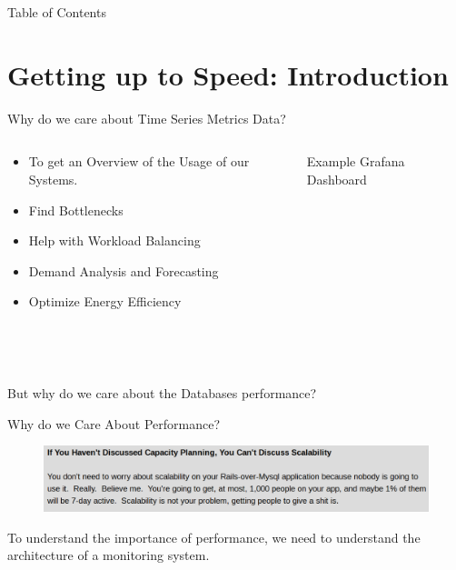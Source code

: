 \documentclass[compress,aspectratio=169]{beamer}
\begin{document}
\begin{frame}[plain]
	\titlepage
\end{frame}

\begin{frame}[t]{Table of Contents}
  \tableofcontents[subsectionstyle=hide/hide]
\end{frame}


\section[Introduction]{Getting up to Speed: Introduction}
\begin{frame}{Why do we care about Time Series Metrics Data?}
\begin{columns}[T]
\begin{column}{0.5\textwidth}
\begin{itemize}
  \item To get an Overview of the Usage of our Systems.
  \item Find Bottlenecks
  \item Help with Workload Balancing
  \item Demand Analysis and Forecasting
  \item Optimize Energy Efficiency
\end{itemize}
\end{column}
\begin{column}{0.5\textwidth}
\begin{figure}
  \caption{Example Grafana Dashboard}
\end{figure}
\end{column}
\end{columns}
~\\~\\
\pause
\begin{center}
  \large
But why do we care about the Databases performance?
\end{center}
\end{frame}

\begin{frame}{Why do we Care About Performance?}
\begin{center}
\begin{figure}
  \includegraphics[width=\textwidth]{assets/scalefoot.png}
  \caption{\cite{ScaleFoot}}
\end{figure}
To understand the importance of performance, we need to understand the architecture of a monitoring system.
\end{center}
\end{frame}
\end{document}
